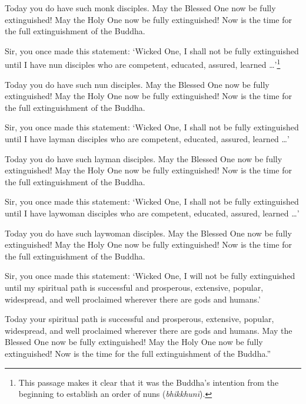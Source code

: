 \documentclass[12pt,openany]{book}%
\begin{document}
Today you do have such monk disciples. May the Blessed One now be fully extinguished! May the Holy One now be fully extinguished! Now is the time for the full extinguishment of the Buddha. 

Sir, you once made this statement: ‘Wicked One, I shall not be fully extinguished until I have nun disciples who are competent, educated, assured, learned …’\footnote{This passage makes it clear that it was the Buddha’s intention from the beginning to establish an order of nuns (\textit{\textsanskrit{bhikkhunī}}). } 

Today you do have such nun disciples. May the Blessed One now be fully extinguished! May the Holy One now be fully extinguished! Now is the time for the full extinguishment of the Buddha. 

Sir, you once made this statement: ‘Wicked One, I shall not be fully extinguished until I have layman disciples who are competent, educated, assured, learned …’ 

Today you do have such layman disciples. May the Blessed One now be fully extinguished! May the Holy One now be fully extinguished! Now is the time for the full extinguishment of the Buddha. 

Sir, you once made this statement: ‘Wicked One, I shall not be fully extinguished until I have laywoman disciples who are competent, educated, assured, learned …’ 

Today you do have such laywoman disciples. May the Blessed One now be fully extinguished! May the Holy One now be fully extinguished! Now is the time for the full extinguishment of the Buddha. 

Sir, you once made this statement: ‘Wicked One, I will not be fully extinguished until my spiritual path is successful and prosperous, extensive, popular, widespread, and well proclaimed wherever there are gods and humans.’ 

Today your spiritual path is successful and prosperous, extensive, popular, widespread, and well proclaimed wherever there are gods and humans. May the Blessed One now be fully extinguished! May the Holy One now be fully extinguished! Now is the time for the full extinguishment of the Buddha.” 
\end{document}
